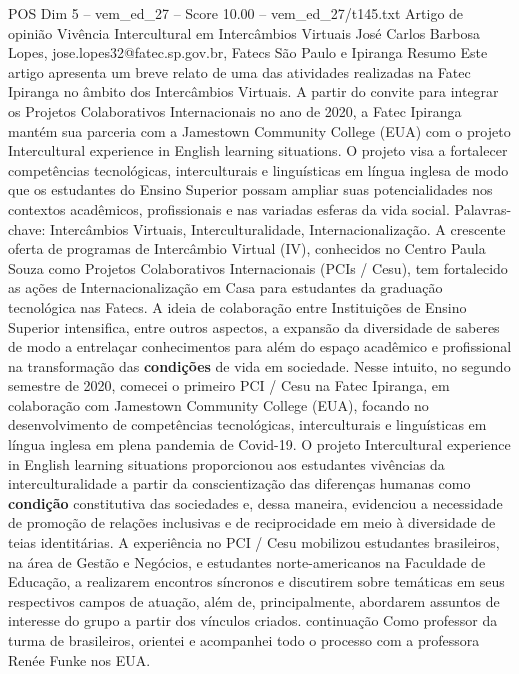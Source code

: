 \begin{textsample}{POS Dim 5 – vem\_ed\_27 – Score 10.00 – vem\_ed\_27/t145.txt}  \label{ex:f5_pos_035}
Artigo de opinião Vivência Intercultural em Intercâmbios Virtuais José Carlos Barbosa Lopes, jose.lopes32@fatec.sp.gov.br, Fatecs São Paulo e Ipiranga Resumo Este artigo apresenta um breve relato de uma das atividades realizadas na Fatec Ipiranga no âmbito dos Intercâmbios Virtuais.
A partir do convite para integrar os Projetos Colaborativos Internacionais no ano de 2020, a Fatec Ipiranga mantém sua parceria com a Jamestown Community College (EUA) com o projeto Intercultural experience in English learning situations.
O projeto visa a fortalecer competências tecnológicas, interculturais e linguísticas em língua inglesa de modo que os estudantes do Ensino Superior possam ampliar suas potencialidades nos contextos acadêmicos, profissionais e nas variadas esferas da vida social.
Palavras-chave: Intercâmbios Virtuais, Interculturalidade, Internacionalização.
A crescente oferta de programas de Intercâmbio Virtual (IV), conhecidos no Centro Paula Souza como Projetos Colaborativos Internacionais (PCIs / Cesu), tem fortalecido as ações de Internacionalização em Casa para estudantes da graduação tecnológica nas Fatecs.
A ideia de colaboração entre Instituições de Ensino Superior intensifica, entre outros aspectos, a expansão da diversidade de saberes de modo a entrelaçar conhecimentos para além do espaço acadêmico e profissional na transformação das \textbf{condições} de vida em sociedade.
Nesse intuito, no segundo semestre de 2020, comecei o primeiro PCI / Cesu na Fatec Ipiranga, em colaboração com Jamestown Community College (EUA), focando no desenvolvimento de competências tecnológicas, interculturais e linguísticas em língua inglesa em plena pandemia de Covid-19.
O projeto Intercultural experience in English learning situations proporcionou aos estudantes vivências da interculturalidade a partir da conscientização das diferenças humanas como \textbf{condição} constitutiva das sociedades e, dessa maneira, evidenciou a necessidade de promoção de relações inclusivas e de reciprocidade em meio à diversidade de teias identitárias.
A experiência no PCI / Cesu mobilizou estudantes brasileiros, na área de Gestão e Negócios, e estudantes norte-americanos na Faculdade de Educação, a realizarem encontros síncronos e discutirem sobre temáticas em seus respectivos campos de atuação, além de, principalmente, abordarem assuntos de interesse do grupo a partir dos vínculos criados. continuação Como professor da turma de brasileiros, orientei e acompanhei todo o processo com a professora Renée Funke nos EUA.

\end{textsample}
